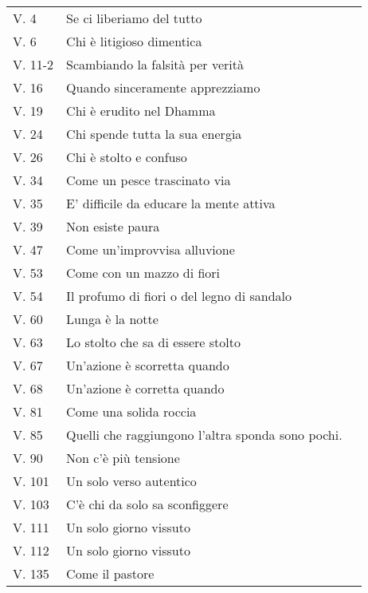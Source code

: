 
{\smaller
\setlength{\parskip}{0pt}
\setlength{\parindent}{0pt}

\begin{longtable}[c]{llr}
V. 4 & Se ci liberiamo del tutto & \pageref{dhp-4}\\
V. 6 & Chi \`{e} litigioso dimentica & \pageref{dhp-6}\\
V. 11-2 & Scambiando la falsit\`{a} per verit\`{a} & \pageref{dhp-11}\\
V. 16 & Quando sinceramente apprezziamo & \pageref{dhp-16}\\
V. 19 & Chi \`{e} erudito nel Dhamma & \pageref{dhp-19}\\
V. 24 & Chi spende tutta la sua energia & \pageref{dhp-24}\\
V. 26 & Chi \`{e} stolto e confuso & \pageref{dhp-26}\\
V. 34 & Come un pesce trascinato via & \pageref{dhp-34}\\
V. 35 & E' difficile da educare la mente attiva & \pageref{dhp-35}\\
V. 39 & Non esiste paura & \pageref{dhp-39}\\
V. 47 & Come un'improvvisa alluvione & \pageref{dhp-47}\\
V. 53 & Come con un mazzo di fiori & \pageref{dhp-53}\\
V. 54 & Il profumo di fiori o del legno di sandalo & \pageref{dhp-54}\\
V. 60 & Lunga \`{e} la notte & \pageref{dhp-60}\\
V. 63 & Lo stolto che sa di essere stolto & \pageref{dhp-63}\\
V. 67 & Un'azione \`{e} scorretta quando & \pageref{dhp-67}\\
V. 68 & Un'azione \`{e} corretta quando & \pageref{dhp-68}\\
V. 81 & Come una solida roccia & \pageref{dhp-81}\\
V. 85 & Quelli che raggiungono l'altra sponda sono pochi. & \pageref{dhp-85}\\
V. 90 & Non c'\`{e} più tensione & \pageref{dhp-90}\\
V. 101 & Un solo verso autentico & \pageref{dhp-101}\\
V. 103 & C'\`{e} chi da solo sa sconfiggere & \pageref{dhp-103}\\
V. 111 & Un solo giorno vissuto & \pageref{dhp-111}\\
V. 112 & Un solo giorno vissuto & \pageref{dhp-112}\\
V. 135 & Come il pastore & \pageref{dhp-135}\\

\end{longtable}}
